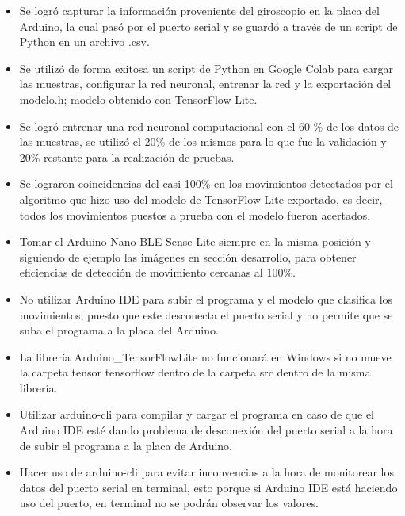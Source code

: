 
\begin{itemize}
    \item Se logró capturar la información proveniente del giroscopio en la placa del Arduino, la cual pasó por el puerto serial y se guardó a través de un script de Python en un archivo .csv.
    \item  Se utilizó de forma exitosa un script de Python en Google Colab para cargar las muestras, configurar la red neuronal, entrenar la red y la exportación del modelo.h; modelo obtenido con TensorFlow Lite.
    \item Se logró entrenar una red neuronal computacional con el 60 \% de los datos de las muestras, se utilizó el 20\% de los mismos para lo que fue la validación y 20\% restante para la realización de pruebas.
    \item Se lograron coincidencias del casi 100\% en los movimientos detectados por el algoritmo que hizo uso del modelo de TensorFlow Lite exportado, es decir, todos los movimientos puestos a prueba con el modelo fueron acertados.
    \item Tomar el Arduino Nano BLE Sense Lite siempre en la misma posición y siguiendo de ejemplo las imágenes en sección desarrollo, para obtener eficiencias de detección de movimiento cercanas al 100\%.
     \item No utilizar Arduino IDE para subir el programa y el modelo que clasifica los movimientos, puesto que este desconecta el puerto serial y no permite que se suba el programa a la placa del Arduino.
    \item La librería Arduino\_TensorFlowLite no funcionará en Windows si no mueve la carpeta tensor tensorflow dentro de la carpeta src dentro de la misma librería.
    \item Utilizar arduino-cli para compilar y cargar el programa en caso de que el Arduino IDE esté dando problema de desconexión del puerto serial a la hora de subir el programa a la placa de Arduino.
    \item Hacer uso de arduino-cli para evitar inconvencias a la hora de monitorear los datos del puerto serial en terminal, esto porque si Arduino IDE está haciendo uso del puerto, en terminal no se podrán observar los valores.
\end{itemize}

